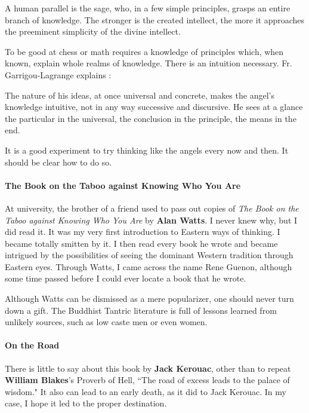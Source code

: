 \begin{quotex}
A human parallel is the sage, who, in a few simple principles, grasps an entire branch of knowledge. The stronger is the created intellect, the more it approaches the preeminent simplicity of the divine intellect. 

\end{quotex}
To be good at chess or math requires a knowledge of principles which, when known, explain whole realms of knowledge. There is an intuition necessary. Fr. Garrigou-Lagrange explains :

\begin{quotex}
The nature of his ideas, at once universal and concrete, makes the angel's knowledge intuitive, not in any way successive and discursive. He sees at a glance the particular in the universal, the conclusion in the principle, the means in the end. 

\end{quotex}
It is a good experiment to try thinking like the angels every now and then. It should be clear how to do so.

\paragraph{The Book on the Taboo against Knowing Who You Are}
At university, the brother of a friend used to pass out copies of \emph{The Book on the Taboo against Knowing Who You Are} by \textbf{Alan Watts}. I never knew why, but I did read it. It was my very first introduction to Eastern ways of thinking. I became totally smitten by it. I then read every book he wrote and became intrigued by the possibilities of seeing the dominant Western tradition through Eastern eyes. Through Watts, I came across the name Rene Guenon, although some time passed before I could ever locate a book that he wrote.

Although Watts can be dismissed as a mere popularizer, one should never turn down a gift. The Buddhist Tantric literature is full of lessons learned from unlikely sources, such as low caste men or even women.

\paragraph{On the Road}
There is little to say about this book by \textbf{Jack Kerouac}, other than to repeat \textbf{William Blakes}'s Proverb of Hell, ``The road of excess leads to the palace of wisdom." It also can lead to an early death, as it did to Jack Kerouac. In my case, I hope it led to the proper destination.

